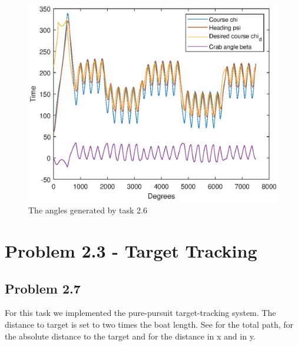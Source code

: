 \begin{figure}[ht]
	\centering
	\includegraphics[width=\textwidth]{angles2_6}
	\caption{The angles generated by task 2.6}
	\label{fig:angles2_6}
\end{figure}

\section*{Problem 2.3 - Target Tracking}
\subsection*{Problem 2.7}
For this task we implemented the pure-pursuit target-tracking system. The distance to target is set to two times the boat length. See  for the total path,  for the absolute distance to the target and  for the distance in x and in y. 

